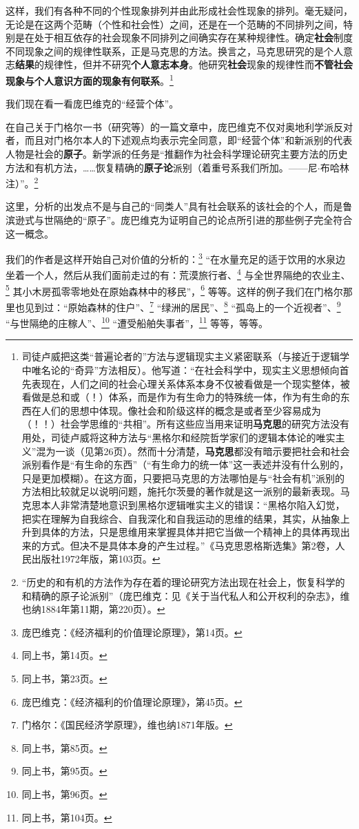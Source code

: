 \documentclass[fontset=fandol, a4paper, 12pt, openright]{ctexbook}
\begin{document}
这样，我们有各种不同的个性现象排列并由此形成社会性现象的排列。毫无疑问，无论是在这两个范畴（个性和社会性）之间，还是在一个范畴的不同排列之间，特别是在处于相互依存的社会现象不同排列之间确实存在某种规律性。确定\textbf{社会}制度不同现象之间的规律性联系，正是马克思的方法。换言之，马克思研究的是个人意志\textbf{结果}的规律性，但并不研究\textbf{个人意志本身}。他研究\textbf{社会}现象的规律性而\textbf{不管社会现象与个人意识方面的现象有何联系}。\footnote{司徒卢威把这类“普遍论者的”方法与逻辑现实主义紧密联系（与接近于逻辑学中唯名论的“奇异”方法相反）。他写道：“在社会科学中，现实主义思想倾向首先表现在，人们之间的社会心理关系体系本身不仅被看做是一个现实整体，被看做是总和或（！）体系，而是作为有生命力的特殊统一体，作为有生命的东西在人们的思想中体现。像社会和阶级这样的概念是或者至少容易成为（！！）社会学思维的“共相”。所有这些应当用来证明\textbf{马克思}的研究方法没有用处，司徒卢威将这种方法与“黑格尔和经院哲学家们的逻辑本体论的唯实主义”混为一谈（见第26页）。然而十分清楚，\textbf{马克思}都没有暗示要把社会和社会派别看作是“有生命的东西”（“有生命力的统一体”这一表述并没有什么别的，只是更加模糊）。在这方面，只要把马克思的方法哪怕是与“社会有机”派别的方法相比较就足以说明问题，施托尔茨曼的著作就是这一派别的最新表现。马克思本人非常清楚地意识到黑格尔逻辑唯实主义的错误：“黑格尔陷入幻觉，把实在理解为自我综合、自我深化和自我运动的思维的结果，其实，从抽象上升到具体的方法，只是思维用来掌握具体并把它当做一个精神上的具体再现出来的方式。但决不是具体本身的产生过程。”《马克思恩格斯选集》第2卷，人民出版社1972年版，第103页。}

我们现在看一看庞巴维克的“经营个体”。

在自己关于门格尔一书（研究等）的一篇文章中，庞巴维克不仅对奥地利学派反对者，而且对门格尔本人的下述观点均表示完全同意，即“经营个体”和新派别的代表人物是社会的\textbf{原子}。新学派的任务是“推翻作为社会科学理论研究主要方法的历史方法和有机方法，……恢复精确的\textbf{原子论}派别（着重号系我们所加。——尼$\cdot$布哈林注）”。\footnote{“历史的和有机的方法作为存在着的理论研究方法出现在社会上，恢复科学的和精确的原子论派别”（庞巴维克：见《关于当代私人和公开权利的杂志》，维也纳1884年第11期，第220页）。}

这里，分析的出发点不是与自己的“同类人”具有社会联系的该社会的个人，而是鲁滨逊式与世隔绝的“原子”。庞巴维克为证明自己的论点所引进的那些例子完全符合这一概念。

我们的作者是这样开始自己对价值的分析的：\footnote{庞巴维克：《经济福利的价值理论原理》，第14页。} “在水量充足的适于饮用的水泉边坐着一个人，然后从我们面前走过的有：荒漠旅行者、\footnote{同上书，第14页。} 与全世界隔绝的农业主、\footnote{同上书，第23页。} 其小木房孤零零地处在原始森林中的移民”，\footnote{庞巴维克：《经济福利的价值理论原理》，第45页。} 等等。这样的例子我们在门格尔那里也见到过：“原始森林的住户”、\footnote{门格尔：《国民经济学原理》，维也纳1871年版。} “绿洲的居民”、\footnote{同上书，第85页。} “孤岛上的一个近视者”、\footnote{同上书，第95页。} “与世隔绝的庄稼人”、\footnote{同上书，第96页。} “遭受船舶失事者”，\footnote{同上书，第104页。} 等等，等等。
\end{document}
